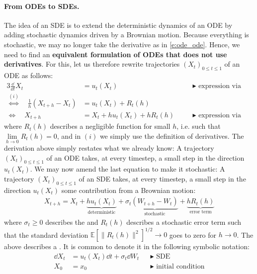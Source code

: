 \paragraph{From ODEs to SDEs.} The idea of an SDE is to extend the deterministic dynamics of an ODE by adding stochastic dynamics driven by a Brownian motion. Because everything is stochastic, we may no longer take the derivative as in \cref{e:ode_ode}. Hence, we need to find an \textbf{equivalent formulation of ODEs that does not use derivatives}. For this, let us therefore rewrite trajectories $(X_t)_{0\leq t\leq 1}$ of an ODE as follows:
\begin{alignat*}{3}
    \frac{\dd}{\dd t} X_t &=  u_t(X_t) \quad &&\blacktriangleright\,\,\text{expression via derivatives}\\
    \overset{(i)}{\Leftrightarrow} \quad  \frac{1}{h}\left(X_{t+h}-X_{t}\right)&=u_t(X_t) + R_t(h)&&\\
\Leftrightarrow \quad X_{t+h} &= X_{t}+hu_t(X_t) + hR_t(h)\quad &&\blacktriangleright\,\,\text{expression via infinitesimal updates}
\end{alignat*}
where  $R_t(h)$ describes a negligible function for small $h$, i.e. such that $\lim\limits_{h\to 0}R_t(h)=0$, and in $(i)$ we simply use the definition of derivatives. The derivation above simply restates what we already know: A trajectory $(X_t)_{0 \le t \le 1}$ of an ODE takes, at every timestep, a small step in the direction $u_t(X_t)$. We may now amend the last equation to make it stochastic: A trajectory $(X_t)_{0 \le t \le 1}$ of an SDE takes, at every timestep, a small step in the direction $u_t(X_t)$  some contribution from a Brownian motion:
\begin{align}
    \label{e:infinitesimal_updates_sdes}
    X_{t+h} = X_{t}+\underbrace{hu_t(X_t)}_{\text{deterministic}} + \sigma_t\underbrace{(W_{t+h}-W_{t})}_{\text{stochastic}}+\underbrace{hR_t(h)}_{\text{error term}}
\end{align}
where $\sigma_t\geq 0$ describes the  and $R_t(h)$ describes a stochastic error term such that the standard deviation $\mathbb{E}[\|R_t(h)\|^2]^{1/2}\to 0$ goes to zero for $h\to 0$. The above describes a . It is common to denote it in the following symbolic notation:
\begin{subequations}\label{e:sde_generic}
    \begin{align} 
      \dd X_t &= u_t(X_t)\dd t + \sigma_t\dd W_t &&\blacktriangleright\,\,\text{SDE}\\
      X_0 &= x_0               &&\blacktriangleright\,\,\text{initial condition}
    \end{align}
\end{subequations}
